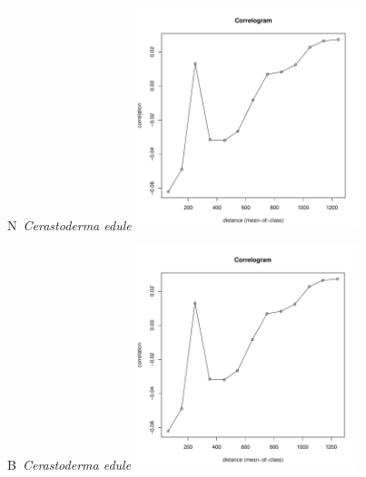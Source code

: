 \documentclass[12pt, a4paper]{disser}
\begin{document}
\begin{figure}[h]
	
	\begin{minipage}[b]{.46\linewidth}
	\begin{center}
	{\small N~{\it Cerastoderma edule}}
		\includegraphics[width=65mm]{../Barenc_Sea/distribution_Moran/Plyazh0812_moran_B_Cerastoderma_edule_.pdf}

	\end{center}
	\end{minipage}
	\hfil %
	\begin{minipage}[b]{.46\linewidth}
	\begin{center}
	{\small B~{\it Cerastoderma edule}}
		\includegraphics[width=65mm]{../Barenc_Sea/distribution_Moran/Plyazh0812_moran_B_Cerastoderma_edule_.pdf}
	\end{center}
	\end{minipage}






\end{figure}
\end{document}
